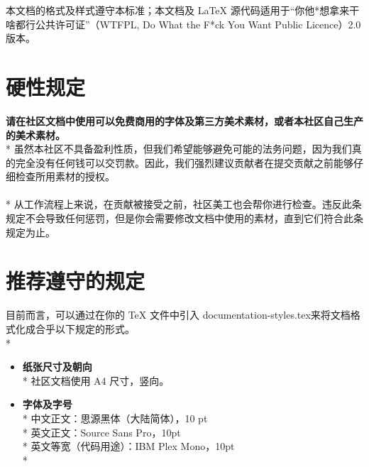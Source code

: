     本文档的格式及样式遵守本标准；本文档及 LaTeX 源代码适用于“你他*想拿来干啥都行公共许可证”（WTFPL, Do What the F*ck You Want Public Licence）2.0 版本。


    \section{硬性规定}
    
    \textbf{请在社区文档中使用可以免费商用的字体及第三方美术素材，或者本社区自己生产的美术素材。}\\*
    虽然本社区不具备盈利性质，但我们希望能够避免可能的法务问题，因为我们真的完全没有任何钱可以交罚款。因此，我们强烈建议贡献者在提交贡献之前能够仔细检查所用素材的授权。
    \\
    \\*
    从工作流程上来说，在贡献被接受之前，社区美工也会帮你进行检查。违反此条规定不会导致任何惩罚，但是你会需要修改文档中使用的素材，直到它们符合此条规定为止。


    \section{推荐遵守的规定}
    目前而言，可以通过在你的 TeX 文件中引入 \ttfamily documentation-styles.tex\rmfamily 来将文档格式化成合乎以下规定的形式。\\*

    \begin{itemize}
        \item\textbf{\large{纸张尺寸及朝向}}\\*
        社区文档使用 A4 尺寸，竖向。
        \\
        \item\textbf{\large{字体及字号}}\\*
        中文正文：思源黑体（大陆简体），10 pt\\*
        英文正文：Source Sans Pro，10pt\\*
        英文等宽（代码用途）：\ttfamily IBM Plex Mono，10pt \rmfamily\\*
        \\
    \end{itemize}    



